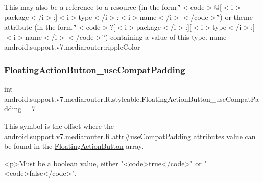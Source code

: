 This may also be a reference to a resource (in the form \char`\"{}$<$code$>$@\mbox{[}$<$i$>$package$<$/i$>$\+:\mbox{]}$<$i$>$type$<$/i$>$\+:$<$i$>$name$<$/i$>$$<$/code$>$\char`\"{}) or theme attribute (in the form \char`\"{}$<$code$>$?\mbox{[}$<$i$>$package$<$/i$>$\+:\mbox{]}\mbox{[}$<$i$>$type$<$/i$>$\+:\mbox{]}$<$i$>$name$<$/i$>$$<$/code$>$\char`\"{}) containing a value of this type.  name android.\+support.\+v7.\+mediarouter\+:ripple\+Color \mbox{\label{classandroid_1_1support_1_1v7_1_1mediarouter_1_1R_1_1styleable_ad73fa0b4b35d2b72943f9fd2e4122f9a}} 
\subsubsection{\texorpdfstring{Floating\+Action\+Button\+\_\+use\+Compat\+Padding}{FloatingActionButton\_useCompatPadding}}
{\footnotesize\ttfamily int android.\+support.\+v7.\+mediarouter.\+R.\+styleable.\+Floating\+Action\+Button\+\_\+use\+Compat\+Padding = 7\hspace{0.3cm}{\ttfamily [static]}}

This symbol is the offset where the \hyperlink{classandroid_1_1support_1_1v7_1_1mediarouter_1_1R_1_1attr_a5a5595096c2291118e9efc9446b81f89}{android.\+support.\+v7.\+mediarouter.\+R.\+attr\#use\+Compat\+Padding} attribute\textquotesingle{}s value can be found in the \hyperlink{classandroid_1_1support_1_1v7_1_1mediarouter_1_1R_1_1styleable_ae665bad1758a0b708ec034929b76af91}{Floating\+Action\+Button} array.

\begin{DoxyVerb}      <p>Must be a boolean value, either "<code>true</code>" or "<code>false</code>".
\end{DoxyVerb}
 

